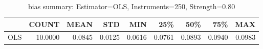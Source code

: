 \begin{table}[ht]
\centering
\caption{bias summary: Estimator=OLS, Instruments=250, Strength=0.80}
\begin{tabular}{lrrrrrrrr}
\toprule
 & COUNT & MEAN & STD & MIN & 25\% & 50\% & 75\% & MAX \\
\midrule
OLS & 10.0000 & 0.0845 & 0.0125 & 0.0616 & 0.0761 & 0.0893 & 0.0940 & 0.0983 \\
\bottomrule
\end{tabular}
\end{table}
